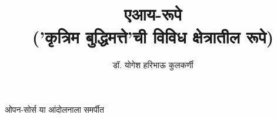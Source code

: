 
\usepackage{fontspec}
\usepackage{tikz}
\usepackage{everypage}

\setmainfont[Script=Devanagari]{Nirmala Text}
\newfontfamily{}
\newfontfamily{}
\graphicspath{{images/}}

\date{}

\title{
    {\Huge \textbf{\color{titlecolor} एआय-रूपे}} \\ 
    \vspace{0.5em}
    {\large \color{subtitlecolor} ('कृत्रिम बुद्धिमत्ते'ची विविध क्षेत्रातील रूपे)}
}

\author{\textsc{\color{authorcolor}डॉ. योगेश हरिभाऊ कुलकर्णी}}

\renewcommand{\contentsname}{अनुक्रमणिका}




\frontmatter

\maketitle



\begin{dedication}
ओपन-सोर्स या आंदोलनाला समर्पीत
\end{dedication}

\tableofcontents

\mainmatter




